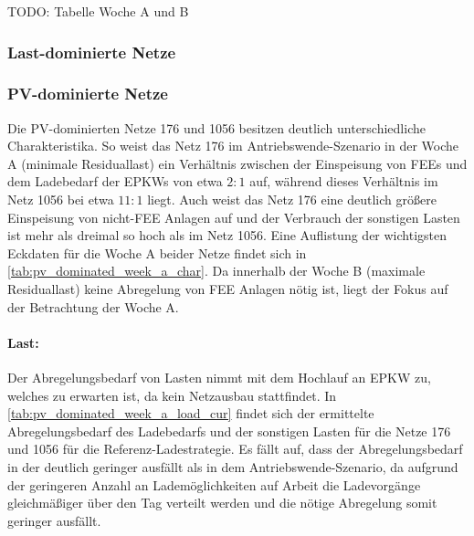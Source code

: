 {\color{red} TODO: Tabelle Woche A und B}


\subsubsection{Last-dominierte Netze}




\subsubsection{PV-dominierte Netze}

Die \gls{PV}-dominierten Netze \num{176} und \num{1056} besitzen deutlich unterschiedliche Charakteristika.
So weist das Netz \num{176} im Antriebswende-Szenario in der Woche A (minimale Residuallast) ein Verhältnis zwischen der Einspeisung von \glspl{FEE} und dem Ladebedarf der \glspl{EPKW} von etwa \(2:1\) auf, während dieses Verhältnis im Netz \num{1056} bei etwa \(11:1\) liegt.
Auch weist das Netz \num{176} eine deutlich größere Einspeisung von nicht-\gls{FEE} Anlagen auf und der Verbrauch der sonstigen Lasten ist mehr als dreimal so hoch als im Netz \num{1056}.
Eine Auflistung der wichtigsten Eckdaten für die Woche A beider Netze findet sich in \autoref{tab:pv_dominated_week_a_char}.
Da innerhalb der Woche B (maximale Residuallast) keine Abregelung von \gls{FEE} Anlagen nötig ist, liegt der Fokus auf der Betrachtung der Woche A.




\paragraph{Last:}

Der Abregelungsbedarf von Lasten nimmt mit dem Hochlauf an \gls{EPKW} zu, welches zu erwarten ist, da kein Netzausbau stattfindet.
In \autoref{tab:pv_dominated_week_a_load_cur} findet sich der ermittelte Abregelungsbedarf des Ladebedarfs und der sonstigen Lasten für die Netze \num{176} und \num{1056} für die Referenz-Ladestrategie.
Es fällt auf, dass der Abregelungsbedarf in der \SzeFirmenparkplatz deutlich geringer ausfällt als in dem Antriebswende-Szenario, da aufgrund der geringeren Anzahl an Lademöglichkeiten auf Arbeit die Ladevorgänge gleichmäßiger über den Tag verteilt werden und die nötige Abregelung somit geringer ausfällt.



